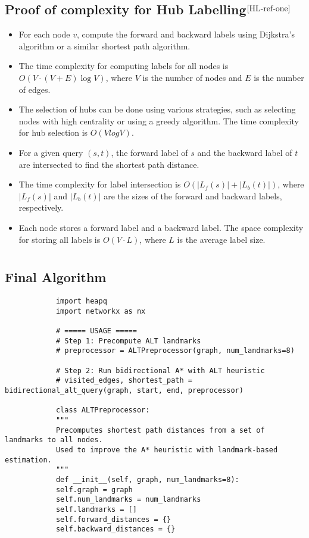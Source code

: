 \begin{appendices}
\section{Proof of complexity for Hub Labelling$^{\cite{HL-ref-one}}$}\label{appendix:Hub Labelling:Complexity}
	\begin{itemize}
		\item For each node $v$, compute the forward and backward labels using Dijkstra's algorithm or a similar shortest path algorithm.
		\item The time complexity for computing labels for all nodes is $O(V \cdot (V+E)\log V)$, where $V$ is the number of nodes and $E$ is the number of edges.
		\item The selection of hubs can be done using various strategies, such as selecting nodes with high centrality or using a greedy algorithm. The time complexity for hub selection is $O(VlogV)$.
		\item For a given query $(s,t)$, the forward label of $s$ and the backward label of $t$ are intersected to find the shortest path distance.
		\item The time complexity for label intersection is $O(|L_f(s)| + |L_b(t)|)$, where $|L_f(s)|$ and $|L_b(t)|$ are the sizes of the forward and backward labels, respectively.
		\item Each node stores a forward label and a backward label. The space complexity for storing all labels is $O(V \cdot L)$, where $L$ is the average label size.
	\end{itemize}
	
	\chapter{}
	\section{Final Algorithm}\label{appendix:design:final_code}
		\begin{lstlisting}
			import heapq
			import networkx as nx
			
			# ===== USAGE =====
			# Step 1: Precompute ALT landmarks
			# preprocessor = ALTPreprocessor(graph, num_landmarks=8)
			
			# Step 2: Run bidirectional A* with ALT heuristic
			# visited_edges, shortest_path = bidirectional_alt_query(graph, start, end, preprocessor)
			
			class ALTPreprocessor:
			"""
			Precomputes shortest path distances from a set of landmarks to all nodes.
			Used to improve the A* heuristic with landmark-based estimation.
			"""
			def __init__(self, graph, num_landmarks=8):
			self.graph = graph
			self.num_landmarks = num_landmarks
			self.landmarks = []
			self.forward_distances = {}
			self.backward_distances = {}
			

\end{lstlisting}
\end{appendices}
